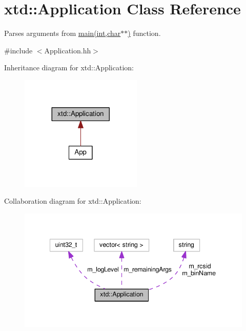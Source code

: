 \hypertarget{classxtd_1_1Application}{}\section{xtd\+:\+:Application Class Reference}
\label{classxtd_1_1Application}


Parses arguments from \hyperlink{doc_2example_2Application_8hh_a6b77b2233054447db17959182b5fb02b}{main(int,char$\ast$$\ast$)} function.  




{\ttfamily \#include $<$Application.\+hh$>$}



Inheritance diagram for xtd\+:\+:Application\+:
\nopagebreak
\begin{figure}[H]
\begin{center}
\leavevmode
\includegraphics[width=164pt]{classxtd_1_1Application__inherit__graph}
\end{center}
\end{figure}


Collaboration diagram for xtd\+:\+:Application\+:
\nopagebreak
\begin{figure}[H]
\begin{center}
\leavevmode
\includegraphics[width=341pt]{classxtd_1_1Application__coll__graph}
\end{center}
\end{figure}
